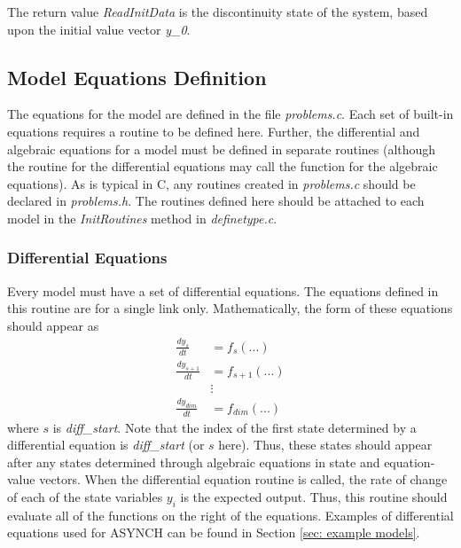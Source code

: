 \documentclass[12pt]{article}
\begin{document}
The return value \emph{ReadInitData} is the discontinuity state of the system, based upon the initial value vector \emph{y\_0}.


\subsection{Model Equations Definition} \label{sec: model equations definition}

The equations for the model are defined in the file \emph{problems.c}. Each set of built-in equations requires a routine to be defined here. Further, the differential and algebraic equations for a model must be defined in separate routines (although the routine for the differential equations may call the function for the algebraic equations). As is typical in C, any routines created in \emph{problems.c} should be declared in \emph{problems.h}. The routines defined here should be attached to each model in the \emph{InitRoutines} method in \emph{definetype.c}.

\subsubsection{Differential Equations} \label{sec: differential equations}

Every model must have a set of differential equations. The equations defined in this routine are for a single link only. Mathematically, the form of these equations should appear as
\begin{align*}
 \frac{d y_s}{dt} &= f_s(...) \\
 \frac{d y_{s+1}}{dt} &= f_{s+1}(...) \\
 &\vdots \\
 \frac{d y_{dim}}{dt} &= f_{dim}(...)
\end{align*}
where $s$ is \emph{diff\_start}. Note that the index of the first state determined by a differential equation is \emph{diff\_start} (or $s$ here). Thus, these states should appear after any states determined through algebraic equations in state and equation-value vectors. When the differential equation routine is called, the rate of change of each of the state variables $y_i$ is the expected output. Thus, this routine should evaluate all of the functions on the right of the equations. Examples of differential equations used for ASYNCH can be found in Section \ref{sec: example models}.
\end{document}
